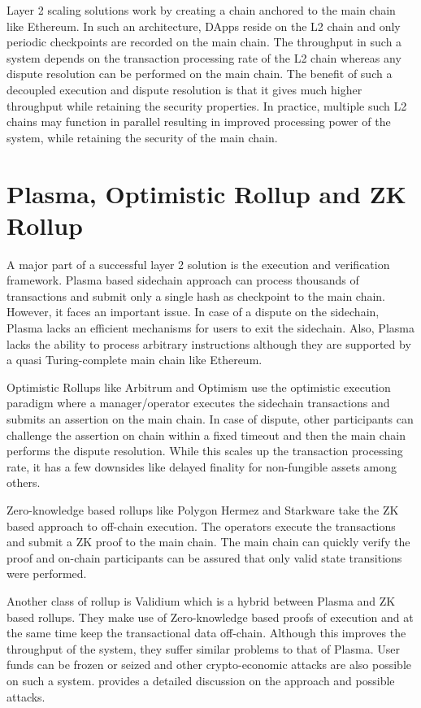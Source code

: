 \documentclass[sigconf, screen=true, nonacm]{acmart}
\begin{document}
    Layer 2 scaling solutions work by creating a chain anchored to the main chain like Ethereum. In such an architecture, DApps reside on the L2 chain and only periodic checkpoints are recorded on the main chain. The throughput in such a system depends on the transaction processing rate of the L2 chain whereas any dispute resolution can be performed on the main chain. The benefit of such a decoupled execution and dispute resolution is that it gives much higher throughput while retaining the security properties. In practice, multiple such L2 chains may function in parallel resulting in improved processing power of the system, while retaining the security of the main chain. 

\section{Plasma, Optimistic Rollup and ZK Rollup}\label{rollup}
    A major part of a successful layer 2 solution is the execution and verification framework. Plasma based sidechain approach can process thousands of transactions and submit only a single hash as checkpoint to the main chain. However, it faces an important issue. In case of a dispute on the sidechain, Plasma lacks an efficient mechanisms for users to exit the sidechain. Also, Plasma lacks the ability to process arbitrary instructions although they are supported by a quasi Turing-complete main chain like Ethereum. 

    Optimistic Rollups like Arbitrum and Optimism use the optimistic execution paradigm where a manager/operator executes the sidechain transactions and submits an assertion on the main chain. In case of dispute, other participants can challenge the assertion on chain within a fixed timeout and then the main chain performs the dispute resolution. While this scales up the transaction processing rate, it has a few downsides like delayed finality for non-fungible assets among others. 

    Zero-knowledge based rollups like Polygon Hermez and Starkware take the ZK based approach to off-chain execution. The operators execute the transactions and submit a ZK proof to the main chain. The main chain can quickly verify the proof and on-chain participants can be assured that only valid state transitions were performed. 

    Another class of rollup is Validium which is a hybrid between Plasma and ZK based rollups. They make use of Zero-knowledge based proofs of execution and at the same time keep the transactional data off-chain. Although this improves the throughput of the system, they suffer similar problems to that of Plasma. User funds can be frozen or seized and other crypto-economic attacks are also possible on such a system. \cite{StarkEx:2020} provides a detailed discussion on the approach and possible attacks. 
\end{document}
